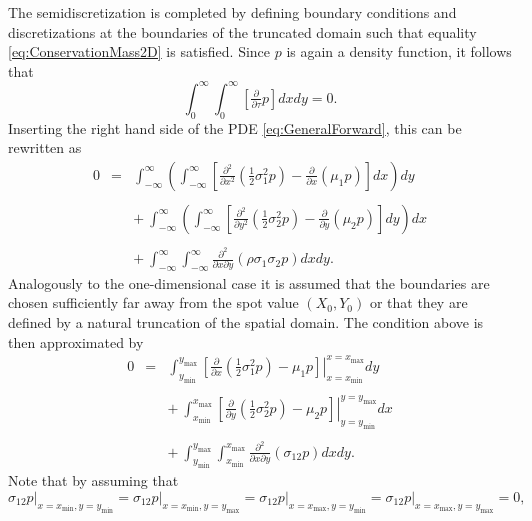 \documentclass[10pt]{article}
\begin{document}
The semidiscretization is completed by defining boundary conditions and discretizations at the boundaries of the truncated domain such that equality \eqref{eq:ConservationMass2D} is satisfied.
Since $p$ is again a density function, it follows that
$$ \int_{0}^{\infty}\int_{0}^{\infty} \left[ \tfrac{\partial}{\partial \tau} p \right] dx dy = 0. $$
Inserting the right hand side of the PDE \eqref{eq:GeneralForward}, this can be rewritten as
\begin{eqnarray*}
0 &=& \int_{-\infty}^{\infty} \left( \int_{-\infty}^{\infty} \left[ \tfrac{\partial^{2}}{\partial x^{2}} \left(\tfrac{1}{2} \sigma^{2}_{1}p \right) -  \tfrac{\partial}{\partial x} \left( \mu_{1} p \right) \right] dx \right) dy \\\\
&& + \ \int_{-\infty}^{\infty} \left( \int_{-\infty}^{\infty} \left[ \tfrac{\partial^{2}}{\partial y^{2}} \left( \tfrac{1}{2} \sigma_{2}^{2} p \right) - \tfrac{\partial}{\partial y} \left( \mu_{2} p \right) \right] dy \right) dx \\\\
&& + \ \int_{-\infty}^{\infty}\int_{-\infty}^{\infty} \tfrac{\partial^{2}}{\partial x \partial y} \left( \rho \sigma_{1}\sigma_{2} p \right) dx dy.
\end{eqnarray*}
Analogously to the one-dimensional case it is assumed that the boundaries are chosen sufficiently far away from the spot value $(X_{0},Y_{0})$ or that they are defined by a natural truncation of the spatial domain. 
The condition above is then approximated by
\begin{eqnarray}
0 &=& \int_{y_{\min}}^{y_{\max}} \left. \left[ \tfrac{\partial}{\partial x} \left(\tfrac{1}{2} \sigma^{2}_{1}p \right) - \mu_{1} p \right]\right\vert_{x=x_{\min}}^{x=x_{\max}} dy \nonumber \\ \nonumber \\
&& + \ \int_{x_{\min}}^{x_{\max}} \left. \left[ \tfrac{\partial}{\partial y} \left(\tfrac{1}{2} \sigma^{2}_{2}p \right) - \mu_{2} p \right] \right\vert_{y=y_{\min}}^{y=y_{\max}} dx \nonumber \\ \nonumber \\
&& + \ \int_{y_{\min}}^{y_{\max}}\int_{x_{\min}}^{x_{\max}} \tfrac{\partial^{2}}{\partial x \partial y} \left( \sigma_{12} p \right) dx dy. \label{eq:BC2D}
\end{eqnarray}
Note that by assuming that
\begin{equation}
\sigma_{12}p \vert_{x=x_{\min},y=y_{\min}} = \sigma_{12}p \vert_{x=x_{\min},y=y_{\max}} = \sigma_{12}p \vert_{x=x_{\max},y=y_{\min}} = \sigma_{12}p \vert_{x=x_{\max},y=y_{\max}} =0,
\label{eq:HoekpuntenNul}
\end{equation}
\end{document}

